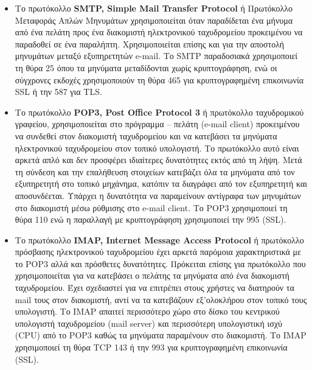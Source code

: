 \begin{itemize}
\item Το πρωτόκολλο \textbf{SMTP, Simple Mail Transfer Protocol} ή Πρωτόκολλο Μεταφοράς Απλών Μηνυμάτων χρησιμοποιείται όταν παραδίδεται ένα μήνυμα από ένα πελάτη προς ένα διακομιστή ηλεκτρονικού ταχυδρομείου προκειμένου να παραδοθεί σε ένα παραλήπτη. Χρησιμοποιείται επίσης και για την αποστολή μηνυμάτων μεταξύ εξυπηρετητών e-mail. Το SMTP παραδοσιακά χρησιμοποιεί τη θύρα 25 όπου τα μηνύματα μεταδίδονται χωρίς κρυπτογράφηση, ενώ οι σύγχρονες εκδοχές χρησιμοποιούν τη θύρα 465 για κρυπτογραφημένη επικοινωνία SSL ή την 587 για TLS.
\item Το πρωτόκολλο \textbf{POP3, Post Office Protocol 3} ή πρωτόκολλο ταχυδρομικού γραφείου, χρησιμοποιείται στο πρόγραμμα -- πελάτη (e-mail client) προκειμένου να συνδεθεί στον διακομιστή ταχυδρομείου και να κατεβάσει τα μηνύματα ηλεκτρονικού ταχυδρομείου στον τοπικό υπολογιστή. Το πρωτόκολλο αυτό είναι αρκετά απλό και δεν προσφέρει ιδιαίτερες δυνατότητες εκτός από τη λήψη. Μετά τη σύνδεση και την επαλήθευση στοιχείων κατεβάζει όλα τα μηνύματα από τον εξυπηρετητή στο τοπικό μηχάνημα, κατόπιν τα διαγράφει από τον εξυπηρετητή και αποσυνδέεται. Υπάρχει η δυνατότητα να παραμείνουν αντίγραφα των μηνυμάτων στο διακομιστή μέσω ρύθμισης στο e-mail client. Το POP3 χρησιμοποιεί τη θύρα 110 ενώ η παραλλαγή με κρυπτογράφηση χρησιμοποιεί την 995 (SSL).
\item Το πρωτόκολλο \textbf{IMAP, Internet Message Access Protocol} ή πρωτόκολλο πρόσβασης ηλεκτρονικού ταχυδρομείου έχει αρκετά παρόμοια χαρακτηριστικά με το POP3 αλλά και πρόσθετες δυνατότητες. Πρόκειται επίσης για πρωτόκολλο που χρησιμοποιείται για να κατεβάσει ο πελάτης τα μηνύματα από ένα διακομιστή ταχυδρομείου. Έχει σχεδιαστεί για να επιτρέπει στους χρήστες να διατηρούν τα mail τους στον διακομιστή, αντί να τα κατεβάζουν εξ'ολοκλήρου στον τοπικό τους υπολογιστή. Το IMAP απαιτεί περισσότερο χώρο στο δίσκο του κεντρικού υπολογιστή ταχυδρομείου (mail server) και περισσότερη υπολογιστική ισχύ (CPU) από το POP3 καθώς τα μηνύματα παραμένουν στο διακομιστή. Το IMAP χρησιμοποιεί τη θύρα TCP 143 ή την 993 για κρυπτογραφημένη επικοινωνία (SSL).
\end{itemize}

